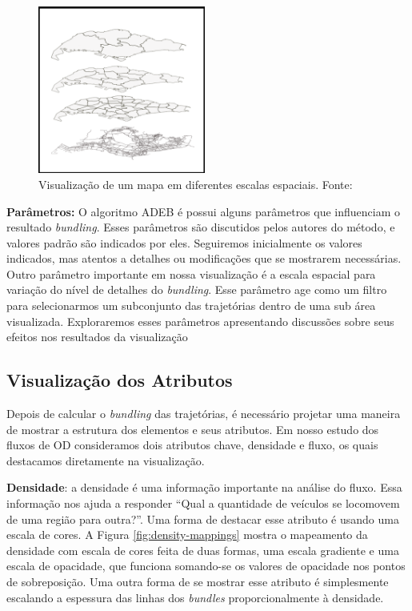 \begin{figure}[!htb]
  \centering
  \includegraphics[width=55mm]{../figuras/multi-scale.png}
  \caption[Visualização de um mapa em diferentes escalas espaciais]{Visualização de um mapa em diferentes escalas espaciais. Fonte: \citet{Zeng2013}}
  \label{fig:multi-scale}
\end{figure}

\textbf{Parâmetros:} O algoritmo ADEB é possui alguns parâmetros que
influenciam o resultado \emph{bundling}. Esses parâmetros são discutidos pelos
autores do método, e valores padrão são indicados por eles. Seguiremos
inicialmente os valores indicados, mas atentos a detalhes ou modificações que
se mostrarem necessárias. Outro parâmetro importante em nossa visualização é a
escala espacial para variação do nível de detalhes do \emph{bundling}. Esse
parâmetro age como um filtro para selecionarmos um subconjunto das trajetórias
dentro de uma sub área visualizada. Exploraremos esses parâmetros apresentando
discussões sobre seus efeitos nos resultados da visualização

\subsection{Visualização dos Atributos}
Depois de calcular o \emph{bundling} das trajetórias, é necessário projetar uma
maneira de mostrar a estrutura dos elementos e seus atributos. Em nosso estudo
dos fluxos de OD consideramos dois atributos chave, densidade e fluxo, os quais
destacamos diretamente na visualização. 

\textbf{Densidade}: a densidade é uma informação importante na análise do
fluxo. Essa informação nos ajuda a responder ``Qual a quantidade de veículos
se locomovem de uma região para outra?''. Uma forma de destacar esse atributo é
usando uma escala de cores. A Figura \ref{fig:density-mappings} mostra o
mapeamento da densidade com escala de cores feita de duas formas, uma escala
gradiente e uma escala de opacidade, que funciona somando-se os valores de
opacidade nos pontos de sobreposição. Uma outra forma de se mostrar esse
atributo é simplesmente escalando a espessura das linhas dos \emph{bundles}
proporcionalmente à densidade. 

